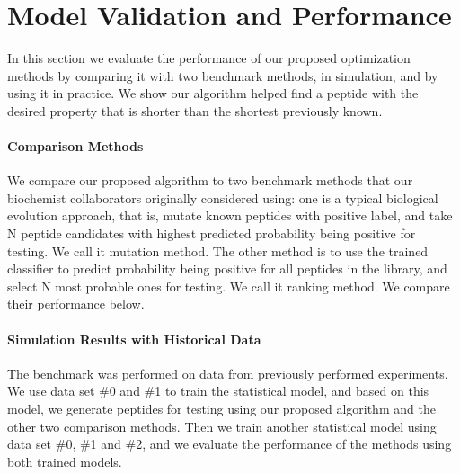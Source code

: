 \documentclass[12pt]{article}
\begin{document}
\section{Model Validation and Performance}
In this section we evaluate the performance of our proposed optimization methods by comparing it with two benchmark methods, in simulation, and by using it in practice.  We show our algorithm helped find a peptide with the desired property that is shorter than the shortest previously known.


\paragraph{Comparison Methods}
We compare our proposed algorithm to two benchmark methods that our biochemist collaborators originally considered using: one is a typical biological evolution approach, that is, mutate known peptides with positive label, and take N peptide candidates with highest predicted probability being positive for testing. We call it mutation method. The other method is to use the trained classifier to predict probability being positive for all peptides in the library, and select N most probable ones for testing. We call it ranking method. We compare their performance below. %

\paragraph{Simulation Results with Historical Data}
The benchmark was performed on data from previously performed experiments. We use data set \#0 and \#1 to train the statistical model, and based on this model, we generate peptides for testing using our proposed algorithm and the other two comparison methods. Then we train another statistical model using data set \#0, \#1 and \#2, and we evaluate the performance of the methods using both trained models.
\end{document}
